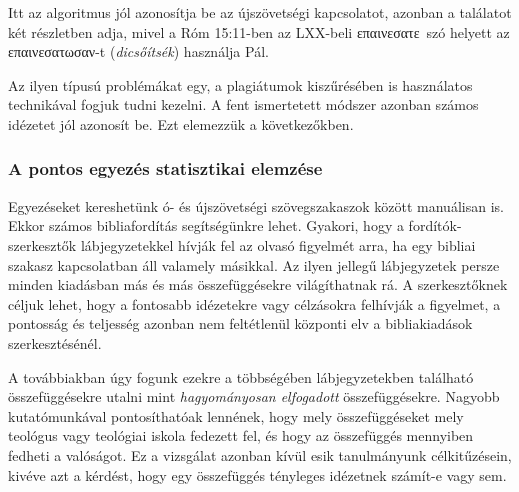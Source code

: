 \documentclass{article}
\newcommand\gr{\selectlanguage{greek}\frenchspacing}
\newcommand\hu{\selectlanguage{magyar}\frenchspacing}
\begin{document}
Itt az algoritmus jól azonosítja be az újszövetségi kapcsolatot, azonban a találatot
két részletben adja, mivel a Róm 15:11-ben az LXX-beli \gr επαινεσατε\hu\ szó helyett az
\gr επαινεσατωσαν\hu-t (\textit{dicsőítsék}) használja Pál.


Az ilyen típusú problémákat egy, a plagiátumok kiszűrésében is használatos technikával
fogjuk tudni kezelni. A fent ismertetett módszer azonban számos idézetet jól azonosít be.
Ezt elemezzük a következőkben.

\subsubsection{A pontos egyezés statisztikai elemzése}

Egyezéseket kereshetünk ó- és újszövetségi szövegszakaszok között manuálisan is. Ekkor
számos bibliafordítás segítségünkre lehet. Gyakori, hogy a fordítók-szerkesztők
lábjegyzetekkel hívják fel az olvasó figyelmét arra, ha egy bibliai szakasz
kapcsolatban áll valamely másikkal. Az ilyen jellegű lábjegyzetek persze
minden kiadásban más és más összefüggésekre világíthatnak rá. A szerkesztőknek
céljuk lehet, hogy a fontosabb idézetekre vagy célzásokra felhívják a figyelmet,
a pontosság és teljesség azonban nem feltétlenül központi elv a bibliakiadások szerkesztésénél.

A továbbiakban úgy fogunk ezekre a többségében lábjegyzetekben található
összefüggésekre utalni mint \textit{hagyományosan elfogadott} összefüggésekre.
Nagyobb kutatómunkával pontosíthatóak lennének, hogy mely összefüggéseket
mely teológus vagy teológiai iskola fedezett fel, és hogy az összefüggés
mennyiben fedheti a valóságot. Ez a vizsgálat azonban kívül esik tanulmányunk célkitűzésein,
kivéve azt a kérdést, hogy egy összefüggés tényleges idézetnek számít-e vagy sem.


\end{document}
